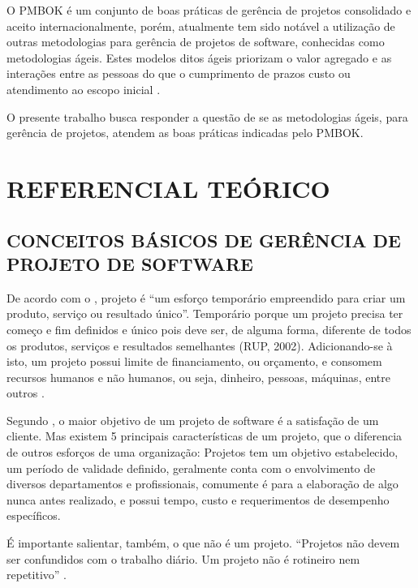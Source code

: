 \documentclass[
    12pt,               %
    openright,          %
    twoside,            %
    a4paper,            %
    chapter=TITLE,     %
    english,            %
    spanish,            %
    portuguese              %
    ]{abntex2}
\begin{document}
O PMBOK é um conjunto de boas práticas de gerência de projetos consolidado e aceito internacionalmente, porém, atualmente tem sido notável a utilização de outras metodologias para gerência de projetos de software, conhecidas como metodologias ágeis. Estes modelos ditos ágeis priorizam o valor agregado e as interações entre as pessoas do que o cumprimento de prazos custo ou atendimento ao escopo inicial \cite[p.~xxi]{prikladnickiAtAll}.


O presente trabalho busca responder a questão de se as metodologias ágeis, para gerência de projetos, atendem as boas práticas indicadas pelo PMBOK.



\chapter{REFERENCIAL TEÓRICO}

\section{CONCEITOS BÁSICOS DE GERÊNCIA DE PROJETO DE SOFTWARE}

De acordo com o , projeto é \textquotedblleft{}um esforço temporário empreendido para criar um produto, serviço ou resultado único\textquotedblright{}. Temporário porque um projeto precisa ter começo e fim definidos e único pois deve ser, de alguma forma, diferente de todos os produtos, serviços e resultados semelhantes (RUP, 2002). Adicionando-se à isto, um projeto possui limite de financiamento, ou orçamento, e consomem recursos humanos e não humanos, ou seja, dinheiro, pessoas, máquinas, entre outros \cite[p.~2]{kerzner2011}.


Segundo , o maior objetivo de um projeto de software é a satisfação de um cliente. Mas existem 5 principais características de um projeto, que o diferencia de outros esforços de uma organização: Projetos tem um objetivo estabelecido, um período de validade definido, geralmente conta com o envolvimento de diversos departamentos e profissionais, comumente é para a elaboração de algo nunca antes realizado, e possui tempo, custo e requerimentos de desempenho específicos.


É importante salientar, também, o que não é um projeto. \textquotedblleft{}Projetos não devem ser confundidos com o trabalho diário. Um projeto não é rotineiro nem repetitivo\textquotedblright{} \cite[p.~6]{grayLarson2009}.
\end{document}
